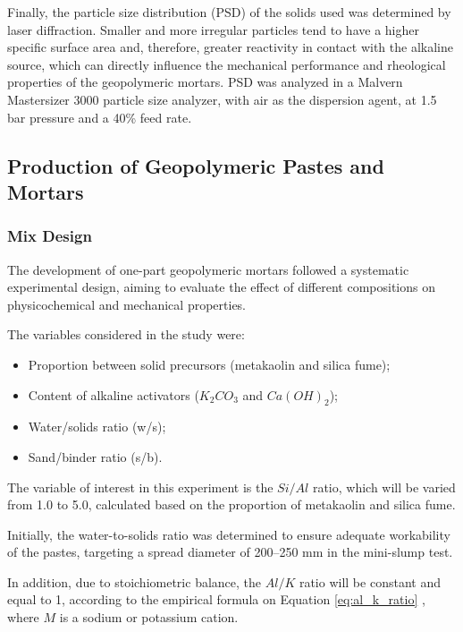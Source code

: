 Finally, the particle size distribution (PSD) of the solids used was determined by laser diffraction. Smaller and more irregular particles tend to have a higher specific surface area and, therefore, greater reactivity in contact with the alkaline source, which can directly influence the mechanical performance and rheological properties of the geopolymeric mortars.
PSD was analyzed in a Malvern Mastersizer 3000 particle size analyzer, with air as the dispersion agent, at 1.5 bar pressure and a 40\% feed rate.

\subsection{Production of Geopolymeric Pastes and Mortars}
\label{sec:production_geopolymeric_pastes_mortars}

\subsubsection{Mix Design}
\label{sec:mix_design}

The development of one-part geopolymeric mortars followed a systematic experimental design, aiming to evaluate the effect of different compositions on physicochemical and mechanical properties.

The variables considered in the study were:

\begin{itemize}
    \item Proportion between solid precursors (metakaolin and silica fume);
    \item Content of alkaline activators ($K_2CO_3$ and $Ca(OH)_2$);
    \item Water/solids ratio (w/s);
    \item Sand/binder ratio (s/b).
\end{itemize}

The variable of interest in this experiment is the $Si/Al$ ratio, which will be varied from 1.0 to 5.0, calculated based on the proportion of metakaolin and silica fume.

Initially, the water-to-solids ratio was determined to ensure adequate workability of the pastes, targeting a spread diameter of 200–250 mm in the mini-slump test.

In addition, due to stoichiometric balance, the $Al/K$ ratio will be constant and equal to 1, according to the empirical formula on Equation \ref{eq:al_k_ratio} \cite{joseph1991geopolymers}, where $M$ is a sodium or potassium cation.

